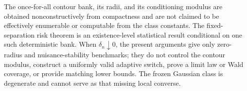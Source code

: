 The once-for-all contour bank, its radii, and its conditioning modulus are obtained nonconstructively from compactness and are not claimed to be effectively enumerable or computable from the class constants.  The fixed-separation risk theorem is an existence-level statistical result conditional on one such deterministic bank.  When \(\delta_n\downarrow0\), the present arguments give only zero-radius and nuisance-stability benchmarks; they do not control the contour modulus, construct a uniformly valid adaptive switch, prove a limit law or Wald coverage, or provide matching lower bounds.  The frozen Gaussian class is degenerate and cannot serve as that missing local converse.